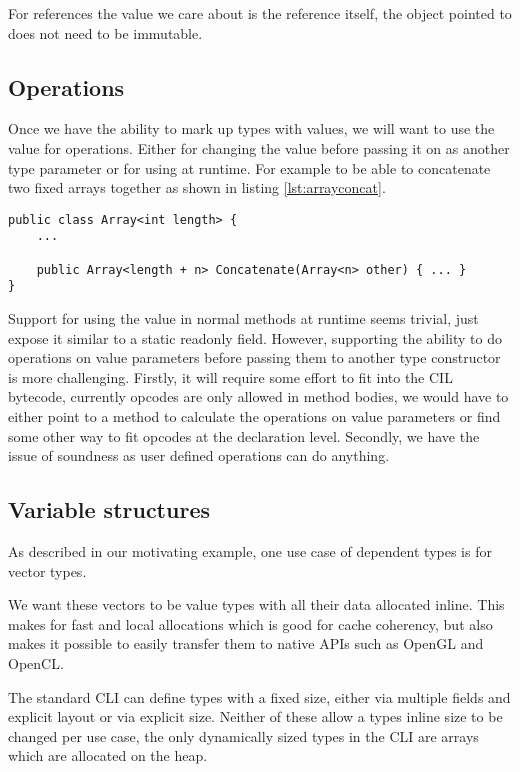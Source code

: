 For references the value we care about is the reference itself, the object pointed to does not need to be immutable.

\subsection{Operations}

Once we have the ability to mark up types with values, we will want
to use the value for operations. Either for changing the value before
passing it on as another type parameter or for using at runtime. 
For example to be able to concatenate two fixed arrays together as shown in listing \ref{lst:arrayconcat}.

\begin{lstlisting}[label={lst:arrayconcat},caption={Concatenate two arrays},keywordstyle={\color{blue}},language=sharpc]
public class Array<int length> { 
	...
	
	public Array<length + n> Concatenate(Array<n> other) { ... }
}
\end{lstlisting}

Support for using the value in normal methods at runtime seems trivial, just
expose it similar to a static readonly field. However, supporting the
ability to do operations on value parameters before passing them to
another type constructor is more challenging. Firstly, it will require
some effort to fit into the CIL bytecode, currently opcodes are only
allowed in method bodies, we would have to either point to a method
to calculate the operations on value parameters or find some other
way to fit opcodes at the declaration level. Secondly, we have the
issue of soundness as user defined operations can do anything.

\subsection{Variable structures}

As described in our motivating example, one use case of dependent types is for vector types.

We want these vectors to be value types with all their data allocated inline. This makes for fast and local
allocations which is good for cache coherency, but also makes it possible to easily transfer them to native
APIs such as OpenGL and OpenCL.

The standard CLI can define types with a fixed size, either via multiple fields and explicit layout or via explicit size.
Neither of these allow a types inline size to be changed per use case, the only dynamically sized types in the CLI are
arrays which are allocated on the heap.

